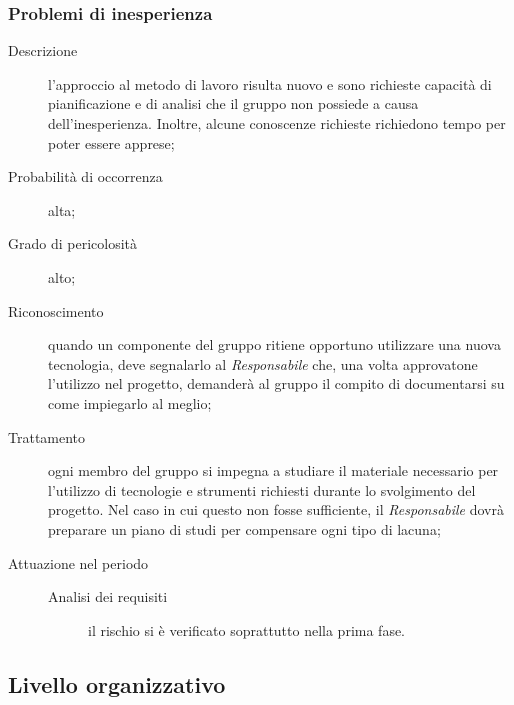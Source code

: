 		\subsubsection{Problemi di inesperienza}
		\begin{description}
			\item[Descrizione] l'approccio al metodo di lavoro risulta nuovo e sono richieste capacità di pianificazione e di analisi che il gruppo non possiede a causa dell'inesperienza. Inoltre, alcune conoscenze richieste richiedono tempo per poter essere apprese;
			\item[Probabilità di occorrenza] alta;
			\item[Grado di pericolosità] alto;
			\item[Riconoscimento] quando un componente del gruppo ritiene opportuno utilizzare una nuova tecnologia, deve segnalarlo al \emph{Responsabile} che, una volta approvatone l'utilizzo nel progetto, demanderà al gruppo il compito di documentarsi su come 	impiegarlo al meglio;
			\item[Trattamento] ogni membro del gruppo si impegna a studiare il materiale necessario per l'utilizzo di tecnologie e strumenti richiesti durante lo svolgimento del progetto. Nel caso in cui questo non fosse sufficiente, il \emph{Responsabile} dovrà preparare un piano di studi per compensare ogni tipo di lacuna;
			\item[Attuazione nel periodo]
			\begin{description}
				\item[Analisi dei requisiti]  il rischio si è verificato soprattutto nella prima fase.
			\end{description}
		\end{description}
	\subsection{Livello organizzativo} \label{sec:org}

